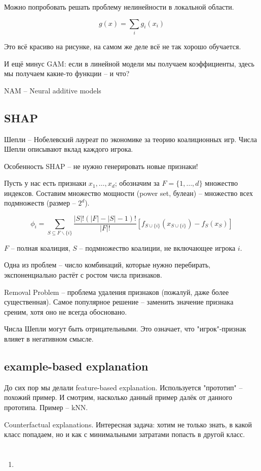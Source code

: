 \documentclass[a4paper,12pt]{article}
\begin{document}
Можно попробовать решать проблему нелинейности в локальной области.

\[ g(x) = \sum_i g_i(x_i) \]

Это всё красиво на рисунке, на самом же деле всё не так хорошо обучается.

И ещё минус GAM: если в линейной модели мы получаем коэффициенты, здесь мы получаем какие-то функции -- и что?

NAM -- Neural additive models

\subsection{SHAP}

Шепли -- Нобелевский лауреат по экономике за теорию коалиционных игр.
Числа Шепли описывают вклад каждого игрока.

Особенность SHAP -- не нужно генерировать новые признаки!

Пусть у нас есть признаки $ x_1, \dots, x_d $; обозначим за $ F = \{ 1, \dots, d \} $ множество индексов.
Составим множество мощности (power set, булеан) -- множество всех подмножеств (размер -- $ 2^d $).

\[ \phi_i = \sum_{S \subseteq  F \backslash \{i\}} \frac{|S|! (|F|-|S|-1)!}{|F|!} [ f_{S \cup \{i\}} \left( x_{S \cup \{i\}} \right) - f_S \left(x_S\right) ] \]

$ F $ -- полная коалиция, $ S $ -- подмножество коалиции, не включающее игрока $ i $.

Одна из проблем -- число комбинаций, которые нужно перебирать, экспоненциально растёт с ростом числа признаков.

Removal Problem -- проблема удаления признаков (пожалуй, даже более существенная).
Самое популярное решение -- заменить значение признака среним, хотя оно не всегда обосновано.

Числа Шепли могут быть отрицательными.
Это означает, что "игрок"-признак влияет в негативном смысле.

\subsection{example-based explanation}

До сих пор мы делали feature-based explanation.
Используется "прототип"\hspace{0pt} -- похожий пример.
И смотрим, насколько данный пример далёк от данного прототипа.
Пример -- kNN.

Counterfactual explanations.
Интересная задача: хотим не только знать, в какой класс попадаем, но и как с минимальными затратами попасть в другой класс.

\section{}
\subsection{}

\begin{enumerate}[noitemsep]
	\item 
\end{enumerate}
	
	
\end{document}
